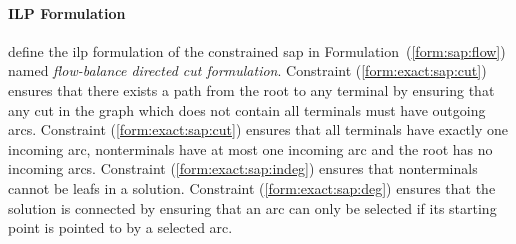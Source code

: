  \paragraph{ILP Formulation}
 \cite{gamrath2017scip} define the \gls{ilp} formulation of the constrained \gls{sap} in Formulation~(\ref{form:sap:flow})
 named \textit{flow-balance directed cut formulation}. Constraint (\ref{form:exact:sap:cut}) ensures that there exists a
  path from the root to any terminal by ensuring that any
 cut in the graph which does not contain all terminals must have outgoing arcs. Constraint (\ref{form:exact:sap:cut})
 ensures that all terminals have exactly one incoming arc, nonterminals have at most one incoming arc and the root has
 no incoming arcs. Constraint (\ref{form:exact:sap:indeg}) ensures that nonterminals cannot be leafs in a solution.
 Constraint (\ref{form:exact:sap:deg}) ensures that the solution is connected by ensuring that an arc can only be selected
 if its starting point is pointed to by a selected arc.

